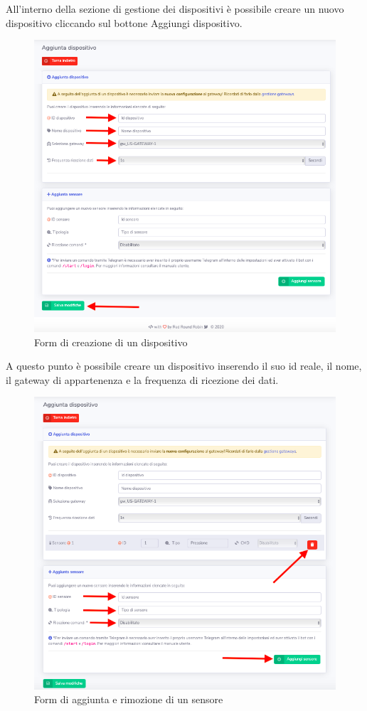 		All'interno della sezione di gestione dei dispositivi è possibile creare un nuovo dispositivo cliccando sul bottone Aggiungi dispositivo. 

		\begin{figure}[H]
		\centering
		\includegraphics[scale=0.600]{res/images/admin/creazDisp.png}
		\caption{Form di creazione di un dispositivo}
	\end{figure}

		A questo punto è possibile creare un dispositivo inserendo il suo id reale, il nome, il gateway di appartenenza e la frequenza di ricezione dei dati. 

		\begin{figure}[H]
		\centering
		\includegraphics[scale=0.600]{res/images/admin/aggRimSens.png}
		\caption{Form di aggiunta e rimozione di un sensore}
	\end{figure}

